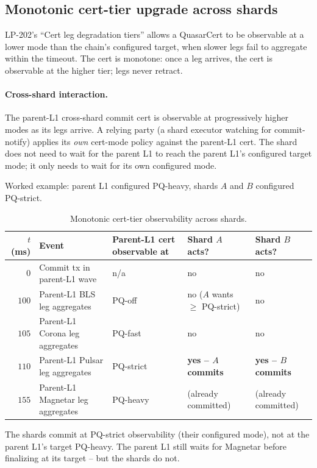\subsection{Monotonic cert-tier upgrade across shards}

LP-202's ``Cert leg degradation tiers'' allows a QuasarCert to be
observable at a lower mode than the chain's configured target, when
slower legs fail to aggregate within the timeout. The cert is
monotone: once a leg arrives, the cert is observable at the higher
tier; legs never retract.

\paragraph{Cross-shard interaction.} The parent-L1 cross-shard
commit cert is observable at progressively higher modes as its legs
arrive. A relying party (a shard executor watching for
commit-notify) applies its \emph{own} cert-mode policy against the
parent-L1 cert. The shard does not need to wait for the parent L1
to reach the parent L1's configured target mode; it only needs to
wait for its own configured mode.

Worked example: parent L1 configured PQ-heavy, shards $A$ and $B$
configured PQ-strict.

\begin{table}[h]
\centering
\small
\begin{tabular}{@{}rp{4cm}p{2.5cm}p{2cm}p{2cm}@{}}
\toprule
\textbf{$t$ (ms)} & \textbf{Event} & \textbf{Parent-L1 cert observable at} & \textbf{Shard $A$ acts?} & \textbf{Shard $B$ acts?} \\
\midrule
$0$ & Commit tx in parent-L1 wave & n/a & no & no \\
$100$ & Parent-L1 BLS leg aggregates & PQ-off & no ($A$ wants $\geq$ PQ-strict) & no \\
$105$ & Parent-L1 Corona leg aggregates & PQ-fast & no & no \\
$110$ & Parent-L1 Pulsar leg aggregates & PQ-strict & \textbf{yes -- $A$ commits} & \textbf{yes -- $B$ commits} \\
$155$ & Parent-L1 Magnetar leg aggregates & PQ-heavy & (already committed) & (already committed) \\
\bottomrule
\end{tabular}
\caption{Monotonic cert-tier observability across shards.}
\label{tab:mono}
\end{table}

The shards commit at PQ-strict observability (their configured
mode), not at the parent L1's target PQ-heavy. The parent L1 still
waits for Magnetar before finalizing at its target -- but the
shards do not.

